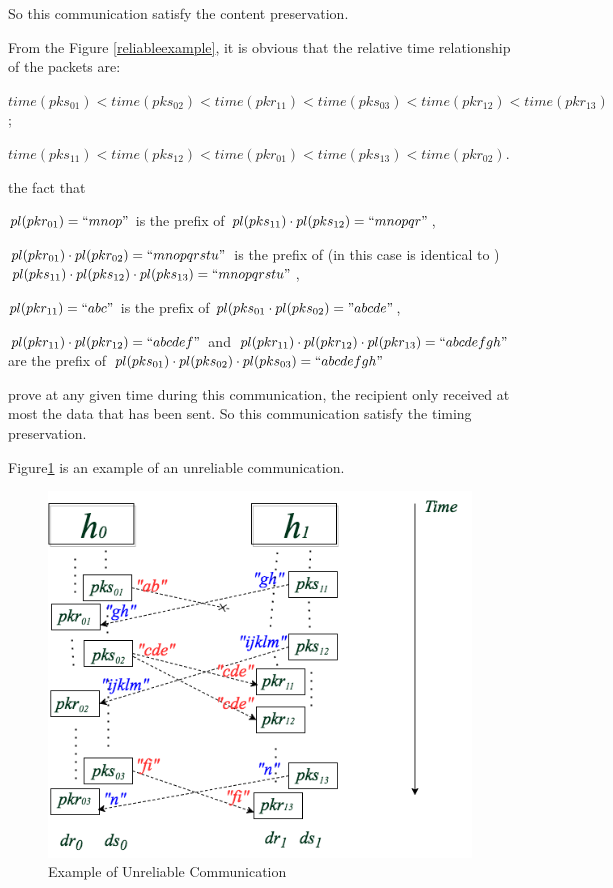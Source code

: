 So this communication satisfy the content preservation. 

From the Figure \ref{reliableexample}, it is obvious that the relative time relationship of the packets are: 

$time(pks_{01}) < time(pks_{02}) < time(pkr_{11})< time(pks_{03}) < time(pkr_{12}) < time(pkr_{13}) $;

$time(pks_{11}) < time(pks_{12}) < time(pkr_{01})< time(pks_{13}) < time(pkr_{02})$. 

the fact that
 
$pl(pkr_{01}) = ``mnop"$ is the prefix of $pl(pks_{11}) \cdot  pl(pks_{12}) = ``mnopqr"$,

$pl(pkr_{01}) \cdot pl(pkr_{02})=``mnopqrstu"$ is the prefix of (in this case is identical to ) $pl(pks_{11}) \cdot pl(pks_{12}) \cdot pl(pks_{13}) = ``mnopqrstu" $,  

$pl(pkr_{11})=``abc"$ is the prefix of $pl(pks_{01} \cdot pl(pks_{02}) = "abcde"$,  

$pl(pkr_{11}) \cdot pl(pkr_{12})= ``abcdef"$ and  $pl(pkr_{11}) \cdot pl(pkr_{12}) \cdot pl(pkr_{13}) = ``abcdefgh"$ are  the prefix of  $pl(pks_{01}) \cdot pl(pks_{02}) \cdot pl(pks_{03})= ``abcdefgh"$

prove at any given time during this communication, the recipient only received at most the data that has been sent. So this communication satisfy the timing preservation. 


Figure\ref{unreliableexample} is an example of an unreliable communication. 

\begin{figure}[H]
\centerline{\includegraphics[scale=0.5]{Figures/unreliableexample}}
\caption{Example of Unreliable Communication}
\label{unreliableexample}
\end{figure}

